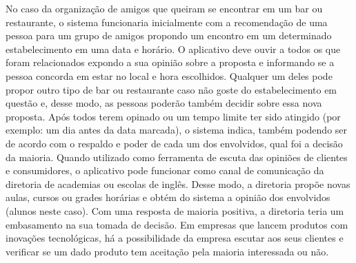  No caso da organização de amigos que queiram se encontrar em um bar ou restaurante, o sistema funcionaria inicialmente com a recomendação de uma pessoa para um grupo de amigos propondo um encontro em um determinado estabelecimento em uma data e horário. O aplicativo deve ouvir a todos os que foram relacionados expondo a sua opinião sobre a proposta e informando se a pessoa concorda em estar no local e hora escolhidos. Qualquer um deles pode propor outro tipo de bar ou restaurante caso não goste do estabelecimento em questão e, desse modo, as pessoas poderão também decidir sobre essa nova proposta. Após todos terem opinado ou um tempo limite ter sido atingido (por exemplo: um dia antes da data marcada), o sistema indica, também podendo ser de acordo com o respaldo e poder de cada um dos envolvidos, qual foi a decisão da maioria. Quando utilizado como ferramenta de escuta das opiniões de clientes e consumidores, o aplicativo pode funcionar como canal de comunicação da diretoria de academias ou escolas de inglês. Desse modo, a diretoria propõe novas aulas, cursos ou grades horárias e obtém do sistema a opinião dos envolvidos (alunos neste caso). Com uma resposta de maioria positiva, a diretoria teria um embasamento na sua tomada de decisão. Em empresas que lancem produtos com inovações tecnológicas, há a possibilidade da empresa escutar aos seus clientes e verificar se um dado produto tem aceitação pela maioria interessada ou não.
